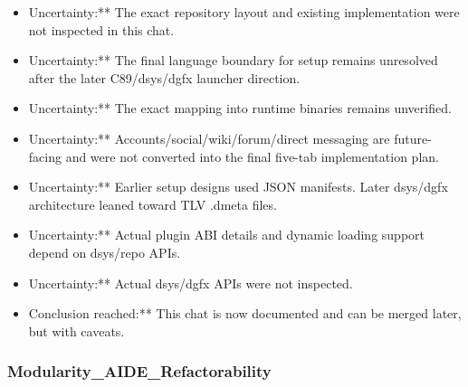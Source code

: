 \documentclass[11pt,a4paper]{report}
\begin{document}
\begin{itemize}
\item Uncertainty:** The exact repository layout and existing implementation were not inspected in this chat.
\item Uncertainty:** The final language boundary for setup remains unresolved after the later C89/dsys/dgfx launcher direction.
\item Uncertainty:** The exact mapping into runtime binaries remains unverified.
\item Uncertainty:** Accounts/social/wiki/forum/direct messaging are future-facing and were not converted into the final five-tab implementation plan.
\item Uncertainty:** Earlier setup designs used JSON manifests. Later dsys/dgfx architecture leaned toward TLV .dmeta files.
\item Uncertainty:** Actual plugin ABI details and dynamic loading support depend on dsys/repo APIs.
\item Uncertainty:** Actual dsys/dgfx APIs were not inspected.
\item Conclusion reached:** This chat is now documented and can be merged later, but with caveats.
\end{itemize}

\subsubsection{Modularity\_AIDE\_Refactorability}
\end{document}
